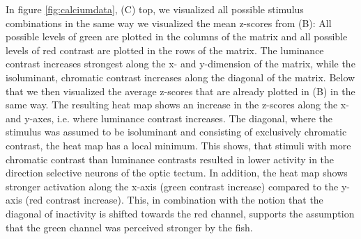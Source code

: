 \vspace{\baselineskip}

In figure \ref{fig:calciumdata}, (C) top, we visualized all possible stimulus combinations in the same way we visualized the mean z-scores from (B): All possible levels of green are plotted in the columns of the matrix and all possible levels of red contrast are plotted in the rows of the matrix. The luminance contrast increases strongest along the x- and y-dimension of the matrix, while the isoluminant, chromatic contrast increases along the diagonal of the matrix. Below that we then visualized the average z-scores that are already plotted in (B) in the same way. The resulting heat map shows an increase in the z-scores along the x- and y-axes, i.e. where luminance contrast increases. The diagonal, where the stimulus was assumed to be isoluminant and consisting of exclusively chromatic contrast, the heat map has a local minimum. This shows, that stimuli with more chromatic contrast than luminance contrasts resulted in lower activity in the direction selective neurons of the optic tectum. In addition, the heat map shows stronger activation along the x-axis (green contrast increase) compared to the y-axis (red contrast increase). This, in combination with the notion that the diagonal of inactivity is shifted towards the red channel, supports the assumption that the green channel was perceived stronger by the fish.



